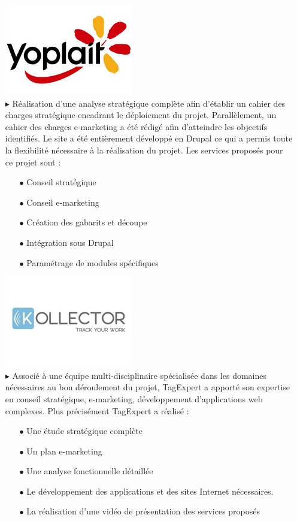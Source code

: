 \documentclass{article}
\begin{document}
\begin{sffamily}
\begin{enumerate}
\item[]{\includegraphics[scale=0.25]{yoplait.jpg}}\\
\newcommand{\indentitem}{\item[\hspace*{0.5cm}$\bullet$]}
$\blacktriangleright$ Réalisation d'une analyse stratégique complète afin d'établir un cahier des charges stratégique encadrant le déploiement du projet. Parallèlement, 
un cahier des charges e-marketing a été rédigé afin d'atteindre les objectifs identifiés. Le site a été entièrement développé en Drupal ce qui a permis toute la flexibilité 
nécessaire à la réalisation du projet. Les services proposés pour ce projet sont :
\begin{itemize}
	\indentitem Conseil stratégique
	\indentitem Conseil e-marketing
	\indentitem Création des gabarits et découpe
	\indentitem Intégration sous Drupal
	\indentitem Paramétrage de modules spécifiques
\end{itemize}
\item[]\includegraphics[scale=0.30]{kollector.jpg}\\
$\blacktriangleright$ Associé à une équipe multi-disciplinaire spécialisée dans les domaines nécessaires au bon déroulement du projet, TagExpert a apporté son expertise en 
conseil stratégique, e-marketing, développement d'applications web complexes. Plus précisément TagExpert a réalisé :
\begin{itemize}
	\indentitem Une étude stratégique complète
	\indentitem Un plan e-marketing
	\indentitem Une analyse fonctionnelle détaillée
	\indentitem Le développement des applications et des sites Internet nécessaires.
	\indentitem La réalisation d'une vidéo de présentation des services proposés \\

\end{itemize}
\end{enumerate}
\end{sffamily}
\end{document}
